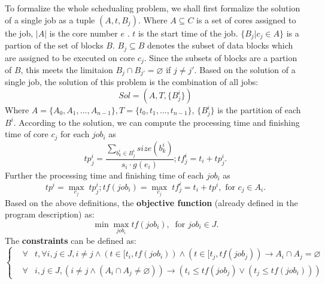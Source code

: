 \documentclass{llncs}
\begin{document}
  To formalize the whole schedualing problem, we shall first formalize the solution of a single job as a tuple $(A,t,B_j)$.
  Where $A \subseteq C$ is a set of cores assigned to the job, $|A|$ is the core number $e$ . $t$ is the start time of the job. $\{B_j | c_j \in A\}$ is a partion of the set of blocks $B$.
 $B_j \subseteq B$ denotes the subset of data blocks which are assigned to be executed on core $c_j$. Since the subsets of blocks are a partion of $B$, this meets the limitaion $B_{j} \cap B_{j'} = \varnothing$ if $j \neq j'$.
 Based on the solution of a single job, the solution of this problem is the combination of all jobs:\\
 \begin{equation*}
 Sol = (A,T,\{B_j^i\})
 \end{equation*}
 Where $A = \{A_0,A_1,\dots,A_{n-1}\}, T = \{t_0,t_1,\dots,t_{n-1}\}$, $\{B_j^i\}$ is the partition of each $B^i$. According to the solution, we can compute the processing time and finishing time of core $c_j$ for each $job_i$ as\\
 \begin{equation}
 tp^i_{j} = \frac{\sum_{b^i_{k} \in B^i_{j}}size(b^i_{k})}{s_i \cdot g(e_i)}; tf^i_{j} = t_i + tp^i_{j}.
 \end{equation}
Further the processing time and finishing time of each $job_i$ as\\
 \begin{equation}
 tp^i = \max_{c_j} \; tp_j^i; tf(job_i) = \max_{c_j} \; tf^i_{j} = t_i + tp^i, \text{ for } c_j \in A_i.
 \end{equation}
Based on the above definitions, the \textbf{objective function} (already defined in the program description) as:\\
  \begin{equation*}
  \min \max_{job_i} tf(job_i), \ \text{ for } job_i \in J.
  \end{equation*}
The \textbf{constraints} can be defined as:\\
\begin{equation} \label{constraints-job0}
\left\{
\begin{array}{ccl}
 &\forall &t, \forall i, j \in J, i \neq j \land (t \in [t_i,tf(job_i)) \land (t \in [t_j,tf(job_j))
 \rightarrow A_i \cap A_j = \varnothing \\
 &\forall &i, j \in J, (i \neq j \land (A_i \cap A_j \neq \varnothing)) \rightarrow (t_i \leq tf(job_j) \lor (t_j \leq tf(job_i)))
\end{array}
\right.
\end{equation}
\end{document}
